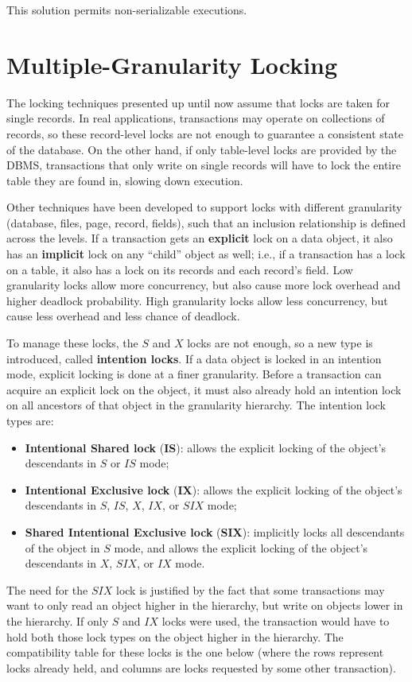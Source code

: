 This solution permits non-serializable executions.

\section{Multiple-Granularity Locking}

The locking techniques presented up until now assume that locks are taken for single records. In real applications, transactions may operate on collections of records, so these record-level locks are not enough to guarantee a consistent state of the database. On the other hand, if only table-level locks are provided by the DBMS, transactions that only write on single records will have to lock the entire table they are found in, slowing down execution.

Other techniques have been developed to support locks with different granularity (database, files, page, record, fields), such that an inclusion relationship is defined across the levels. If a transaction gets an \textbf{explicit} lock on a data object, it also has an \textbf{implicit} lock on any ``child'' object as well; i.e., if a transaction has a lock on a table, it also has a lock on its records and each record's field. Low granularity locks allow more concurrency, but also cause more lock overhead and higher deadlock probability. High granularity locks allow less concurrency, but cause less overhead and less chance of deadlock.

To manage these locks, the $S$ and $X$ locks are not enough, so a new type is introduced, called \textbf{intention locks}. If a data object is locked in an intention mode, explicit locking is done at a finer granularity. Before a transaction can acquire an explicit lock on the object, it must also already hold an intention lock on all ancestors of that object in the granularity hierarchy. The intention lock types are:
\begin{itemize}
    \item \textbf{Intentional Shared lock} (\textbf{IS}): allows the explicit locking of the object's descendants in $S$ or $IS$ mode;

    \item \textbf{Intentional Exclusive lock} (\textbf{IX}): allows the explicit locking of the object's descendants in $S$, $IS$, $X$, $IX$, or $SIX$ mode;

    \item \textbf{Shared Intentional Exclusive lock} (\textbf{SIX}): implicitly locks all descendants of the object in $S$ mode, and allows the explicit locking of the object's descendants in $X$, $SIX$, or $IX$ mode.
\end{itemize}
The need for the $SIX$ lock is justified by the fact that some transactions may want to only read an object higher in the hierarchy, but write on objects lower in the hierarchy. If only $S$ and $IX$ locks were used, the transaction would have to hold both those lock types on the object higher in the hierarchy. The compatibility table for these locks is the one below (where the rows represent locks already held, and columns are locks requested by some other transaction).

